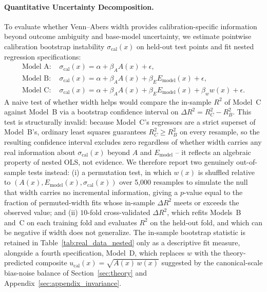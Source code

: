 \documentclass[11pt]{article}
\begin{document}
	\paragraph{Quantitative Uncertainty Decomposition.}
	To evaluate whether Venn--Abers width provides calibration-specific information beyond outcome ambiguity and base-model uncertainty, we estimate pointwise calibration bootstrap instability $\sigma_{\mathrm{cal}}(x)$ on held-out test points and fit nested regression specifications:
	\begin{align}
		\text{Model A: } &\sigma_{\mathrm{cal}}(x) = \alpha + \beta_A A(x) + \epsilon, \\
		\text{Model B: } &\sigma_{\mathrm{cal}}(x) = \alpha + \beta_A A(x) + \beta_E E_{\mathrm{model}}(x) + \epsilon, \\
		\text{Model C: } &\sigma_{\mathrm{cal}}(x) = \alpha + \beta_A A(x) + \beta_E E_{\mathrm{model}}(x) + \beta_w w(x) + \epsilon.
	\end{align}
	A naive test of whether width helps would compare the in-sample $R^2$ of Model~C against Model~B via a bootstrap confidence interval on $\Delta R^2 = R^2_C - R^2_B$. This test is structurally invalid: because Model~C's regressors are a strict superset of Model~B's, ordinary least squares guarantees $R^2_C \geq R^2_B$ on every resample, so the resulting confidence interval excludes zero regardless of whether width carries any real information about $\sigma_{\mathrm{cal}}(x)$ beyond $A$ and $E_{\mathrm{model}}$ -- it reflects an algebraic property of nested OLS, not evidence. We therefore report two genuinely out-of-sample tests instead: (i) a permutation test, in which $w(x)$ is shuffled relative to $(A(x), E_{\mathrm{model}}(x), \sigma_{\mathrm{cal}}(x))$ over 5{,}000 resamples to simulate the null that width carries no incremental information, giving a $p$-value equal to the fraction of permuted-width fits whose in-sample $\Delta R^2$ meets or exceeds the observed value; and (ii) $10$-fold cross-validated $\Delta R^2$, which refits Models~B and~C on each training fold and evaluates $R^2$ on the held-out fold, and which can be negative if width does not generalize. The in-sample bootstrap statistic is retained in Table~\ref{tab:real_data_nested} only as a descriptive fit measure, alongside a fourth specification, Model~D, which replaces $w$ with the theory-predicted composite $u_{\mathrm{cal}}(x) = \sqrt{A(x)\,w(x)}$ suggested by the canonical-scale bias-noise balance of Section~\ref{sec:theory} and Appendix~\ref{sec:appendix_invariance}.
\end{document}
